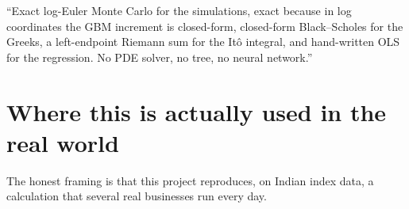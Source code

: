 \documentclass[11pt,a4paper]{article}
\begin{document}
\begin{saybox}
``Exact log-Euler Monte Carlo for the simulations, exact because in log coordinates the GBM
increment is closed-form, closed-form Black--Scholes for the Greeks, a left-endpoint Riemann
sum for the It\^o integral, and hand-written OLS for the regression. No PDE solver, no tree,
no neural network.''
\end{saybox}

\section{Where this is actually used in the real world}
\label{sec:real}

The honest framing is that this project reproduces, on Indian index data, a calculation that
several real businesses run every day.
\end{document}
